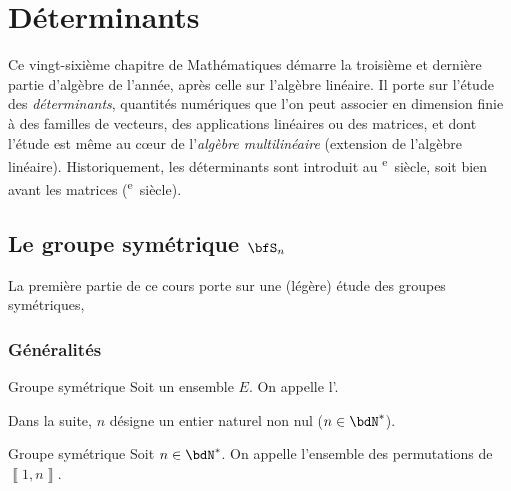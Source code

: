 \documentclass[a4paper,french,bookmarks]{book}
\begin{document}
    \chapter{Déterminants}
        
    
    Ce vingt-sixième chapitre de Mathématiques démarre la troisième et dernière partie d'algèbre de l'année, après celle sur l'algèbre linéaire. Il porte sur l'étude des \textit{déterminants}, quantités numériques que l'on peut associer en dimension finie à des familles de vecteurs, des applications linéaires ou des matrices, et dont l'étude est même au cœur de l'\textit{algèbre multilinéaire} (extension de l'algèbre linéaire). Historiquement, les déterminants sont introduit au \textsc{}\textsuperscript{e}~siècle, soit bien avant les matrices (\textsc{}\textsuperscript{e}~siècle).

    \initcourschapter{}

    \section{Le groupe symétrique $\bfS_n$}
    
    La première partie de ce cours porte sur une (légère) étude des groupes symétriques, 

    \subsection{Généralités}
    
    \begin{definition}{Groupe symétrique}{}
        Soit un ensemble $E$. On appelle  l'.
    \end{definition}
    
    Dans la suite, $n$ désigne un entier naturel non nul ($n \in \bdN^*$).
    
    \begin{definition}{Groupe symétrique}{}
        Soit $n \in \bdN^*$. On appelle  l'ensemble des permutations de $\left\llbracket 1, n\right\rrbracket$.
    \end{definition}
    
\end{document}
